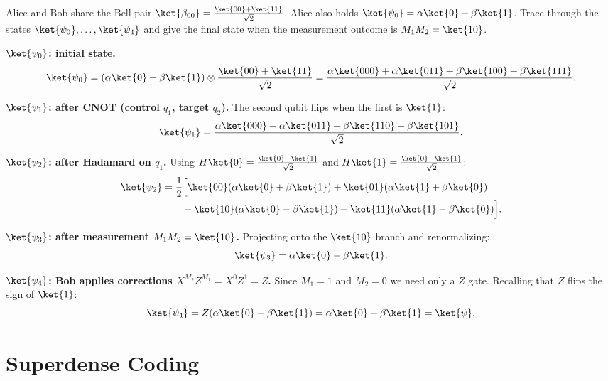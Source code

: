 \documentclass[oneside]{academica}
\begin{document}
\begin{exercise*}
  Alice and Bob share the Bell pair $\ket{\beta_{00}}=\tfrac{\ket{00}+\ket{11}}{\sqrt{2}}$.
  Alice also holds $\ket{\psi_0}=\alpha\ket{0}+\beta\ket{1}$.
  Trace through the states $\ket{\psi_0},\ldots,\ket{\psi_4}$ and give
  the final state when the measurement outcome is $M_1M_2=\ket{10}$.

  \textbf{$\ket{\psi_0}$: initial state.}
  \begin{equation*}
    \ket{\psi_0} = (\alpha\ket{0}+\beta\ket{1})\otimes\frac{\ket{00}+\ket{11}}{\sqrt{2}}
    = \frac{\alpha\ket{000}+\alpha\ket{011}+\beta\ket{100}+\beta\ket{111}}{\sqrt{2}}.
  \end{equation*}

  \textbf{$\ket{\psi_1}$: after CNOT (control $q_1$, target $q_2$).}
  The second qubit flips when the first is $\ket{1}$:
  \begin{equation*}
    \ket{\psi_1} = \frac{\alpha\ket{000}+\alpha\ket{011}+\beta\ket{110}+\beta\ket{101}}{\sqrt{2}}.
  \end{equation*}

  \textbf{$\ket{\psi_2}$: after Hadamard on $q_1$.}
  Using $H\ket{0}=\tfrac{\ket{0}+\ket{1}}{\sqrt{2}}$ and $H\ket{1}=\tfrac{\ket{0}-\ket{1}}{\sqrt{2}}$:
  \begin{align*}
    \ket{\psi_2} &= \frac{1}{2}\Bigl[
      \ket{00}(\alpha\ket{0}+\beta\ket{1})
      +\ket{01}(\alpha\ket{1}+\beta\ket{0}) \\
      &\quad\quad+\ket{10}(\alpha\ket{0}-\beta\ket{1})
      +\ket{11}(\alpha\ket{1}-\beta\ket{0})
    \Bigr].
  \end{align*}

  \textbf{$\ket{\psi_3}$: after measurement $M_1M_2=\ket{10}$.}
  Projecting onto the $\ket{10}$ branch and renormalizing:
  \begin{equation*}
    \ket{\psi_3} = \alpha\ket{0}-\beta\ket{1}.
  \end{equation*}

  \textbf{$\ket{\psi_4}$: Bob applies corrections $X^{M_2}Z^{M_1}=X^0 Z^1=Z$.}
  Since $M_1=1$ and $M_2=0$ we need only a $Z$ gate.
  Recalling that $Z$ flips the sign of $\ket{1}$:
  \begin{equation*}
    \ket{\psi_4} = Z(\alpha\ket{0}-\beta\ket{1}) = \alpha\ket{0}+\beta\ket{1} = \ket{\psi}.
  \end{equation*}
\end{exercise*}

\section{Superdense Coding}
\end{document}
